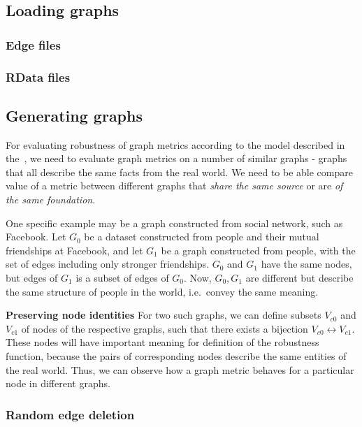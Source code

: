 

\subsection{Loading graphs}

\subsubsection{Edge files}

\subsubsection{RData files}

\subsection{Generating graphs}


For evaluating robustness of graph metrics according to the model described in the~, we need to evaluate graph metrics on a number of similar graphs - graphs that all describe the same facts from the real world.
We need to be able compare value of a metric between different graphs that \textit{share the same source} or are \textit{of the same foundation}.

One specific example may be a graph constructed from social network, such as Facebook.
Let $G_0$ be a dataset constructed from people and their mutual friendships at Facebook, and let $G_1$ be a graph constructed from people, with the set of edges including only stronger friendships. $G_0$ and $G_1$ have the same nodes, but edges of $G_1$ is a subset of edges of $G_0$.
Now, $G_0, G_1$ are different but describe the same structure of people in the world, i.e.\ convey the same meaning.

\textbf{Preserving node identities} For two such graphs, we can define subsets $V_{c0}$ and $V_{c1}$ of nodes of the respective graphs, such that there exists a bijection $V_{c0} \leftrightarrow V_{c1}$.
These nodes will have important meaning for definition of the robustness function, because the pairs of corresponding nodes describe the same entities of the real world.
Thus, we can observe how a graph metric behaves for a particular node in different graphs.

\subsubsection{Random edge deletion}

